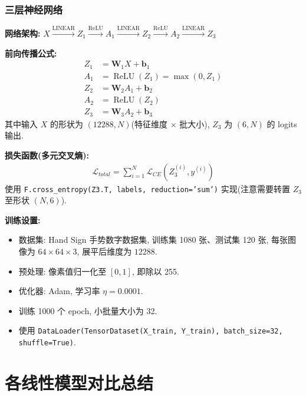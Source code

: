 \documentclass{../../nndlcourse}
\begin{document}
\subsubsection*{三层神经网络}

\textbf{网络架构: }$X \xrightarrow{\text{LINEAR}} Z_1 \xrightarrow{\text{ReLU}} A_1 \xrightarrow{\text{LINEAR}} Z_2 \xrightarrow{\text{ReLU}} A_2 \xrightarrow{\text{LINEAR}} Z_3$

\textbf{前向传播公式: }
\begin{align}
    Z_1 &= \boldsymbol{W}_1 X + \boldsymbol{b}_1 \\
    A_1 &= \operatorname{ReLU}(Z_1) = \max(0, Z_1) \\
    Z_2 &= \boldsymbol{W}_2 A_1 + \boldsymbol{b}_2 \\
    A_2 &= \operatorname{ReLU}(Z_2) \\
    Z_3 &= \boldsymbol{W}_3 A_2 + \boldsymbol{b}_3
\end{align}
其中输入 $X$ 的形状为 $(12288, N)$(特征维度 $\times$ 批大小), $Z_3$ 为 $(6, N)$ 的 logits 输出.

\textbf{损失函数(多元交叉熵): }
\begin{align}
    \mathcal{L}_{total} = \sum_{i=1}^N \mathcal{L}_{CE}\left(Z_3^{(i)}, y^{(i)}\right)
\end{align}
使用 \texttt{F.cross\_entropy(Z3.T, labels, reduction='sum')} 实现(注意需要转置 $Z_3$ 至形状 $(N, 6)$).

\textbf{训练设置: }
\begin{itemize}
    \item 数据集: Hand Sign 手势数字数据集, 训练集 1080 张、测试集 120 张, 每张图像为 $64 \times 64 \times 3$, 展平后维度为 $12288$.
    \item 预处理: 像素值归一化至 $[0, 1]$, 即除以 255.
    \item 优化器: Adam, 学习率 $\eta = 0.0001$.
    \item 训练 1000 个 epoch, 小批量大小为 32.
    \item 使用 \texttt{DataLoader(TensorDataset(X\_train, Y\_train), batch\_size=32, shuffle=True)}.
\end{itemize}

\section{各线性模型对比总结}
\end{document}

